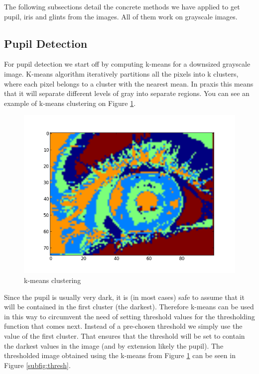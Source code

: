 The following subsections detail the concrete methods we have applied to get pupil, iris and glints from the images. All of them work on grayscale images.

\subsection{Pupil Detection}
For pupil detection we start off by computing k-means for a downsized grayscale image. K-means algorithm iteratively partitions all the pixels into k clusters, where each pixel belongs to a cluster with the nearest mean. In praxis this means that it will separate different levels of gray into separate regions. You can see an example of k-means clustering on Figure \ref{fig:kmeans}.

\begin{figure}[h!]
\centering
\includegraphics[width=\columnwidth]{Handin1/images/k-means.png}
\caption{k-means clustering}
\label{fig:kmeans}
\end{figure}

Since the pupil is usually very dark, it is (in most cases) safe to assume that it will be contained in the first cluster (the darkest). Therefore k-means can be used in this way to circumvent the need of setting threshold values for the thresholding function that comes next. Instead of a pre-chosen threshold we simply use the value of the first cluster. That ensures that the threshold will be set to contain the darkest values in the image (and by extension likely the pupil). The thresholded image obtained using the k-means from Figure \ref{fig:kmeans} can be seen in Figure \ref{subfig:thresh}. 

